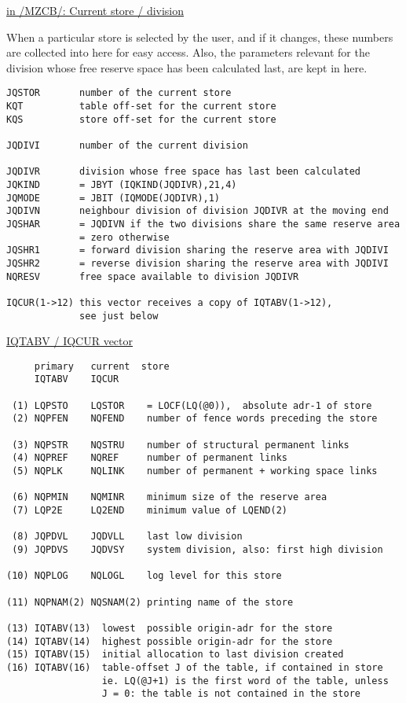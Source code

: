 \begin{flushright} \ul{\large in /MZCB/:  Current store / division}
\end{flushright}

When a particular store is selected by the user, and if it changes,
these numbers are collected into here for easy access.
Also, the parameters relevant for the division
whose free reserve space has been calculated last,
are kept in here.

\begin{verbatim}
JQSTOR       number of the current store
KQT          table off-set for the current store
KQS          store off-set for the current store

JQDIVI       number of the current division

JQDIVR       division whose free space has last been calculated
JQKIND       = JBYT (IQKIND(JQDIVR),21,4)
JQMODE       = JBIT (IQMODE(JQDIVR),1)
JQDIVN       neighbour division of division JQDIVR at the moving end
JQSHAR       = JQDIVN if the two divisions share the same reserve area
             = zero otherwise
JQSHR1       = forward division sharing the reserve area with JQDIVI
JQSHR2       = reverse division sharing the reserve area with JQDIVI
NQRESV       free space available to division JQDIVR

IQCUR(1->12) this vector receives a copy of IQTABV(1->12),
             see just below
\end{verbatim} 
\begin{flushright} \ul{\large IQTABV / IQCUR  vector}
\end{flushright}
\begin{verbatim}
     primary   current  store
     IQTABV    IQCUR

 (1) LQPSTO    LQSTOR    = LOCF(LQ(@0)),  absolute adr-1 of store
 (2) NQPFEN    NQFEND    number of fence words preceding the store

 (3) NQPSTR    NQSTRU    number of structural permanent links
 (4) NQPREF    NQREF     number of permanent links
 (5) NQPLK     NQLINK    number of permanent + working space links

 (6) NQPMIN    NQMINR    minimum size of the reserve area
 (7) LQP2E     LQ2END    minimum value of LQEND(2)

 (8) JQPDVL    JQDVLL    last low division
 (9) JQPDVS    JQDVSY    system division, also: first high division

(10) NQPLOG    NQLOGL    log level for this store

(11) NQPNAM(2) NQSNAM(2) printing name of the store

(13) IQTABV(13)  lowest  possible origin-adr for the store
(14) IQTABV(14)  highest possible origin-adr for the store
(15) IQTABV(15)  initial allocation to last division created
(16) IQTABV(16)  table-offset J of the table, if contained in store
                 ie. LQ(@J+1) is the first word of the table, unless
                 J = 0: the table is not contained in the store
\end{verbatim} 

